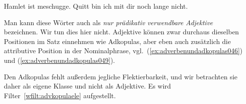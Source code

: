 \begin{exe}
  \ex\label{ex:adverbenundadkopulas045}
  \begin{xlist}
    \ex Hamlet ist meschugge.
    \ex Quitt bin ich mit dir noch lange nicht.
  \end{xlist}
\end{exe}

Man kann diese Wörter auch als \textit{nur prädikativ verwendbare Adjektive} bezeichnen.
Wir tun dies hier nicht.
Adjektive können zwar durchaus dieselben Positionen im Satz einnehmen wie Adkopulas, aber eben auch zusätzlich die attributive Position in der Nominalphrase, vgl.\ (\ref{ex:adverbenundadkopulas046}) und (\ref{ex:adverbenundadkopulas049}).

\begin{exe}
  \ex\label{ex:adverbenundadkopulas046}
  \begin{xlist}
  \end{xlist}
  \ex\label{ex:adverbenundadkopulas049}
  \begin{xlist}
  \end{xlist}
\end{exe}

Den Adkopulas fehlt außerdem jegliche Flektierbarkeit, und wir betrachten sie daher als eigene Klasse und nicht als Adjektive.
Es wird Filter~\ref{wfilt:advkopulaele} aufgestellt.


% 
% 
% 
 
